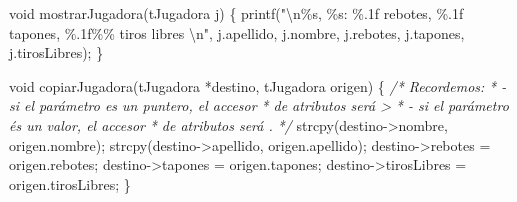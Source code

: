 \documentclass[
]{book}
\newenvironment{Shaded}{\begin{snugshade}}{\end{snugshade}}
\newcommand{\CommentTok}[1]{\textcolor[rgb]{0.56,0.35,0.01}{\textit{#1}}}
\newcommand{\DataTypeTok}[1]{\textcolor[rgb]{0.13,0.29,0.53}{#1}}
\newcommand{\NormalTok}[1]{#1}
\newcommand{\SpecialCharTok}[1]{\textcolor[rgb]{0.00,0.00,0.00}{#1}}
\newcommand{\StringTok}[1]{\textcolor[rgb]{0.31,0.60,0.02}{#1}}
\begin{document}
\begin{Shaded}
\begin{Highlighting}[]
\DataTypeTok{void}\NormalTok{ mostrarJugadora(tJugadora j) \{}
\NormalTok{    printf(}\StringTok{"}\SpecialCharTok{\textbackslash{}n}\StringTok{\%s, \%s: \%.1f rebotes, \%.1f tapones, \%.1f\%\% tiros libres }\SpecialCharTok{\textbackslash{}n}\StringTok{"}\NormalTok{, j.apellido, j.nombre, j.rebotes, j.tapones, j.tirosLibres);}
\NormalTok{\}}

\DataTypeTok{void}\NormalTok{ copiarJugadora(tJugadora *destino, tJugadora origen) \{}
    \CommentTok{/* Recordemos: }
\CommentTok{     * {-} si el parámetro es un puntero, el accesor}
\CommentTok{     *   de atributos será \textquotesingle{}{-}\textgreater{}\textquotesingle{}}
\CommentTok{     * {-} si el parámetro és un valor, el accesor}
\CommentTok{     *   de atributos será \textquotesingle{}.\textquotesingle{}}
\CommentTok{     */}
\NormalTok{    strcpy(destino{-}\textgreater{}nombre, origen.nombre);}
\NormalTok{    strcpy(destino{-}\textgreater{}apellido, origen.apellido);}
\NormalTok{    destino{-}\textgreater{}rebotes = origen.rebotes;}
\NormalTok{    destino{-}\textgreater{}tapones = origen.tapones;}
\NormalTok{    destino{-}\textgreater{}tirosLibres = origen.tirosLibres;}
\NormalTok{\}}


\end{Highlighting}
\end{Shaded}
\end{document}
